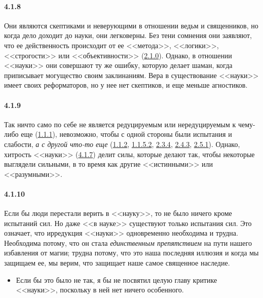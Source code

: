 \paragraph{4.1.8}\hypertarget{par:4.1.8}{} Они являются скептиками и неверующими в отношении ведьм и священников, но когда дело доходит до науки, они легковерны. Без тени сомнения они заявляют, что ее действенность происходит от ее <<метода>>, <<логики>>, <<строгости>> или <<объективности>> (\hyperlink{par:2.1.0}{2.1.0}). Однако, в отношении <<науки>> они совершают ту же ошибку, которую делает шаман, когда приписывает могущество своим заклинаниям. Вера в существование <<науки>> имеет своих реформаторов, но у нее нет скептиков, и еще меньше агностиков.


\paragraph{4.1.9}\hypertarget{par:4.1.9}{} Так ничто само по себе не является редуцируемым или нередуцируемым к чему-либо еще (\hyperlink{par:1.1.1}{1.1.1}), невозможно, чтобы с одной стороны были испытания и слабости, {\itshape а с другой что-то еще} (\hyperlink{par:1.1.2}{1.1.2}, \hyperlink{par:1.1.5.2}{1.1.5.2}, \hyperlink{par:2.3.4}{2.3.4}, \hyperlink{par:2.4.3}{2.4.3}, \hyperlink{par:2.5.1}{2.5.1}). Однако, хитрость <<науки>> (\hyperlink{par:4.1.7}{4.1.7}) делит силы, которые делают так, чтобы некоторые выглядели сильными, в то время как другие <<истинными>> или <<разумными>>.

\paragraph{4.1.10}\hypertarget{par:4.1.10}{}Если бы люди перестали верить в <<науку>>, то не было ничего кроме испытаний сил. Но даже <<в науке>> существуют только испытания сил. Это означает, что ирредукция <<науки>> одновременно необходима и трудна. Необходима потому, что он стала {\itshape единственным препятствием} на пути нашего избавления от магии; трудна потому, что это наша последняя иллюзия и когда мы защищаем ее, мы верим, что защищает наше самое священное наследие. 
	\begin{itemize}
	\item 
	Если бы это было не так, я бы не посвятил целую главу критике <<науки>>, поскольку в ней нет ничего особенного. 
	\end{itemize}	 




